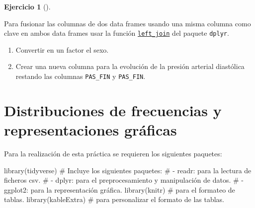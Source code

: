 \documentclass[
  a4paper,
]{scrreport}
\newenvironment{Shaded}{\begin{snugshade}}{\end{snugshade}}
\newcommand{\CommentTok}[1]{\textcolor[rgb]{0.37,0.37,0.37}{#1}}
\newcommand{\FunctionTok}[1]{\textcolor[rgb]{0.28,0.35,0.67}{#1}}
\newcommand{\NormalTok}[1]{\textcolor[rgb]{0.00,0.23,0.31}{#1}}
\theoremstyle{definition}
\newtheorem{exercise}{Ejercicio}[chapter]
\theoremstyle{remark}
\begin{document}
\begin{exercise}[]
\begin{tcolorbox}[enhanced jigsaw, coltitle=black, breakable, bottomtitle=1mm, colbacktitle=quarto-callout-note-color!10!white, rightrule=.15mm, opacityback=0, opacitybacktitle=0.6, left=2mm, colframe=quarto-callout-note-color-frame, title=\textcolor{quarto-callout-note-color}{\faInfo}\hspace{0.5em}{Ayuda}, toprule=.15mm, toptitle=1mm, arc=.35mm, colback=white, titlerule=0mm, bottomrule=.15mm, leftrule=.75mm]

Para fusionar las columnas de dos data frames usando una misma columna
como clave en ambos data frames usar la función
\href{https://dtplyr.tidyverse.org/reference/left_join.dtplyr_step.html}{\texttt{left\_join}}
del paquete \texttt{dplyr}.

\end{tcolorbox}

\begin{enumerate}
\def\labelenumi{\alph{enumi}.}
\setcounter{enumi}{5}
\item
  Convertir en un factor el sexo.
\item
  Crear una nueva columna para la evolución de la presión arterial
  diastólica restando las columnas \texttt{PAS\_FIN} y
  \texttt{PAS\_FIN}.
\end{enumerate}

\end{exercise}


\hypertarget{distribuciones-de-frecuencias-y-representaciones-gruxe1ficas}{%
\chapter{Distribuciones de frecuencias y representaciones
gráficas}\label{distribuciones-de-frecuencias-y-representaciones-gruxe1ficas}}

Para la realización de esta práctica se requieren los siguientes
paquetes:

\begin{Shaded}
\begin{Highlighting}[]
\FunctionTok{library}\NormalTok{(tidyverse) }
\CommentTok{\# Incluye los siguientes paquetes:}
\CommentTok{\# {-} readr: para la lectura de ficheros csv. }
\CommentTok{\# {-} dplyr: para el preprocesamiento y manipulación de datos.}
\CommentTok{\# {-} ggplot2: para la representación gráfica.}
\FunctionTok{library}\NormalTok{(knitr) }\CommentTok{\# para el formateo de tablas.}
\FunctionTok{library}\NormalTok{(kableExtra) }\CommentTok{\# para personalizar el formato de las tablas.}
\end{Highlighting}
\end{Shaded}
\end{document}
